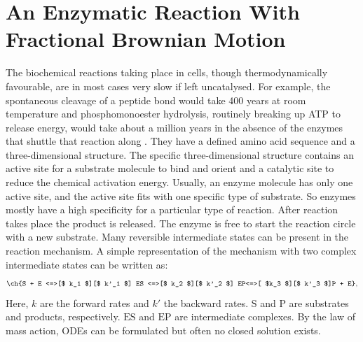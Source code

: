 \documentclass[
  a4paper,BCOR10mm,twoside,
  headsepline,footsepline,%
  fleqn,openbib
]{scrbook}
\begin{document}
\chapter{An Enzymatic Reaction With Fractional Brownian Motion}

The biochemical reactions taking place in cells, though thermodynamically favourable, are in most cases very slow if left uncatalysed. For example, the spontaneous cleavage of a peptide bond would take 400 years at room temperature and phosphomonoester hydrolysis, routinely breaking up ATP to release energy, would take about a million years in the absence of the enzymes that shuttle that reaction along \cite{Wolfenden2001}. They have a defined amino acid sequence and a three-dimensional structure. The specific three-dimensional structure contains an active site for a substrate molecule to bind and orient and a catalytic site to reduce the chemical activation energy. Usually, an enzyme molecule has only one active site, and the active site fits with one specific type of substrate. So enzymes mostly have a high specificity for a particular type of reaction.  After reaction takes place the product is released. The enzyme is free to start the reaction circle with a new substrate. Many reversible intermediate states can be present in the reaction mechanism. A simple representation of the mechanism with two complex intermediate states can be written as:
\begin{align} \label{eq:enyzmescheme}
\ch{S + E <=>[$ k_1 $][$ k'_1 $] ES <=>[$ k_2 $][$ k'_2 $] EP<=>[ $k_3 $][$ k'_3 $]P + E} ,
\end{align}
Here, $k$ are the forward rates and $k'$ the backward rates. $\mathrm{S}$ and $\mathrm{P}$ are substrates and products, respectively. $\mathrm{ES}$ and $\mathrm{EP}$ are intermediate complexes. By the law of mass action, ODEs can be formulated but often no closed solution exists.\par
\end{document}
